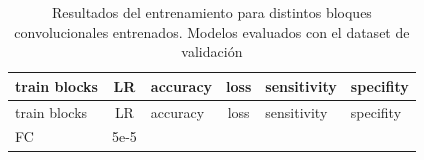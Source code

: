 \documentclass[
  12pt,
  spanish,
  a4paperpaper,
]{report}
\begin{document}
\begin{longtable}[]{@{}lclcll@{}}
\caption{Resultados del entrenamiento para distintos bloques
convolucionales entrenados. Modelos evaluados con el dataset de
validación \label{training}}\tabularnewline
\toprule
\begin{minipage}[b]{0.20\columnwidth}\raggedright
train blocks\strut
\end{minipage} & \begin{minipage}[b]{0.10\columnwidth}\centering
LR\strut
\end{minipage} & \begin{minipage}[b]{0.14\columnwidth}\raggedright
accuracy\strut
\end{minipage} & \begin{minipage}[b]{0.11\columnwidth}\centering
loss\strut
\end{minipage} & \begin{minipage}[b]{0.17\columnwidth}\raggedright
sensitivity\strut
\end{minipage} & \begin{minipage}[b]{0.11\columnwidth}\raggedright
specifity\strut
\end{minipage}\tabularnewline
\midrule
\endfirsthead
\toprule
\begin{minipage}[b]{0.20\columnwidth}\raggedright
train blocks\strut
\end{minipage} & \begin{minipage}[b]{0.10\columnwidth}\centering
LR\strut
\end{minipage} & \begin{minipage}[b]{0.14\columnwidth}\raggedright
accuracy\strut
\end{minipage} & \begin{minipage}[b]{0.11\columnwidth}\centering
loss\strut
\end{minipage} & \begin{minipage}[b]{0.17\columnwidth}\raggedright
sensitivity\strut
\end{minipage} & \begin{minipage}[b]{0.11\columnwidth}\raggedright
specifity\strut
\end{minipage}\tabularnewline
\midrule
\endhead
\begin{minipage}[t]{0.20\columnwidth}\raggedright
FC\strut
\end{minipage} & \begin{minipage}[t]{0.10\columnwidth}\centering
5e-5\strut
\end{minipage} & \begin{minipage}[t]{0.14\columnwidth}\raggedright

\end{minipage}
\end{longtable}
\end{document}
